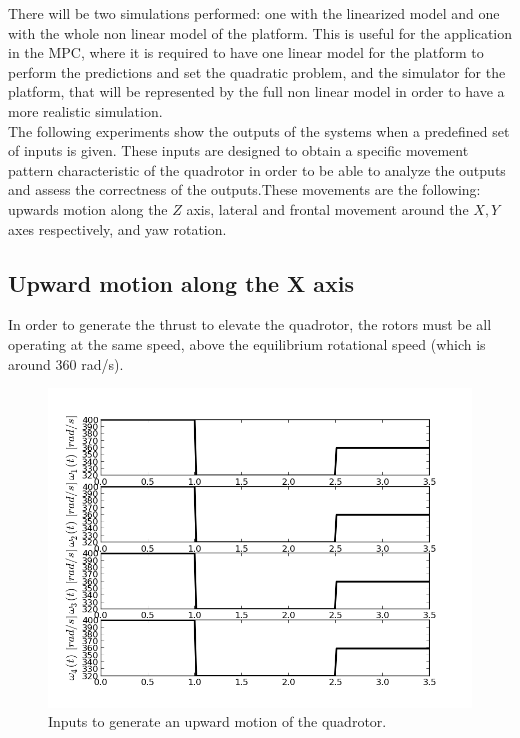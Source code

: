 There will be two simulations performed: one with the linearized model and one with the whole non linear model of the platform. This is useful for the application in the MPC, where it is required to have one linear model for the platform to perform the predictions and set the quadratic problem, and the simulator for the platform, that will be represented by the full non linear model in order to have a more realistic simulation. \\

The following experiments show the outputs of the systems when a predefined set of inputs is given. These inputs are designed to obtain a specific movement pattern characteristic of the quadrotor in order to be able to analyze the outputs and assess the correctness of the outputs.These movements are the following: upwards motion along the $Z$ axis, lateral and frontal movement around the $X,Y$ axes respectively, and yaw rotation. 

\subsection{Upward motion along the X axis}

In order to generate the thrust to elevate the quadrotor, the rotors must be all operating at the same speed, above the equilibrium rotational speed (which is around 360 rad/s). 

\begin{figure}[h!]
\centering
\includegraphics[scale=0.7]{Images/Chapter3/Constant_thrust_upwards/Inputs.png}
\caption{Inputs to generate an upward motion of the quadrotor.}
\label{fig:upwards_inputs}
\end{figure}

